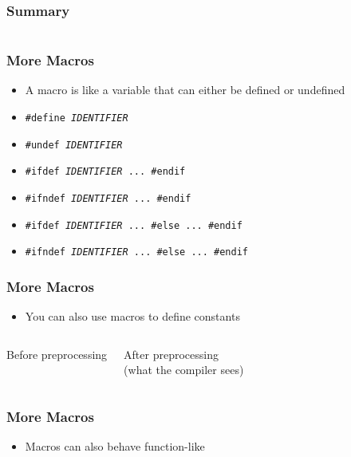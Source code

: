 \documentclass{../ucll-slides}
\begin{document}
\begin{frame}
  \frametitle{Summary}
  \begin{columns}
    \column{6cm}
    \column{6cm}
  \end{columns}
\end{frame}

\begin{frame}
  \frametitle{More Macros}
  \begin{itemize}
    \item A macro is like a variable
          that can either be defined or undefined
    \item {\tt \#define {\it IDENTIFIER}}
    \item {\tt \#undef {\it IDENTIFIER}}
    \item {\tt \#ifdef {\it IDENTIFIER} ... \#endif}
    \item {\tt \#ifndef {\it IDENTIFIER} ... \#endif}
    \item {\tt \#ifdef {\it IDENTIFIER} ... \#else ... \#endif}
    \item {\tt \#ifndef {\it IDENTIFIER} ... \#else ... \#endif}
  \end{itemize}
\end{frame}

\begin{frame}
  \frametitle{More Macros}
  \begin{itemize}
    \item You can also use macros to define constants
  \end{itemize}
  \begin{columns}[t]
    \column{5cm}
    \begin{center} Before preprocessing \end{center}
    \column{5cm}
    \begin{center} After preprocessing \\ (what the compiler sees) \end{center}
  \end{columns}
\end{frame}

\begin{frame}
  \frametitle{More Macros}
  \begin{itemize}
    \item Macros can also behave function-like
  \end{itemize}
  \begin{overprint}
  \end{overprint}
\end{frame}
\end{document}
